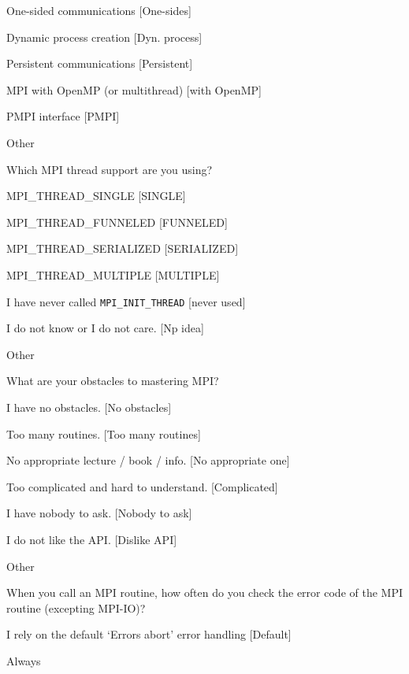 \documentclass[preprint,5p,times]{elsarticle}
\begin{document}
{\begin{description}
\begin{inparaenum}[{\bf C}1)]
    \item One-sided communications [One-sides]
    \item Dynamic process creation [Dyn. process]
    \item Persistent communications [Persistent]
    \item MPI with OpenMP (or multithread) [with OpenMP]
    \item PMPI interface [PMPI]
    \item Other
    \end{inparaenum}
  \item[Q18*:] Which MPI thread support are you using?
    \begin{inparaenum}[{\bf C}1)]
    \item MPI\_THREAD\_SINGLE [SINGLE]
    \item MPI\_THREAD\_FUNNELED [FUNNELED]
    \item MPI\_THREAD\_SERIALIZED [SERIALIZED]
    \item MPI\_THREAD\_MULTIPLE [MULTIPLE]
    \item I have never called {\tt MPI\_INIT\_THREAD} [never used]
    \item I do not know or I do not care. [Np idea]
    \item Other
    \end{inparaenum}
  \item[Q19*:] What are your obstacles to mastering MPI?
    \begin{inparaenum}[{\bf C}1)]
    \item I have no obstacles. [No obstacles]
    \item Too many routines. [Too many routines]
    \item No appropriate lecture / book / info. [No appropriate one]
    \item Too complicated and hard to understand. [Complicated]
    \item I have nobody to ask. [Nobody to ask]
    \item I do not like the API. [Dislike API]
    \item Other
    \end{inparaenum}
  \item[Q20:] When you call an MPI routine, how often do you check the error code of the MPI routine  (excepting MPI-IO)?
    \begin{inparaenum}[{\bf C}1)]
    \item I rely on the default ‘Errors abort’ error handling [Default]
    \item Always

\end{inparaenum}
\end{description}}
\end{document}
